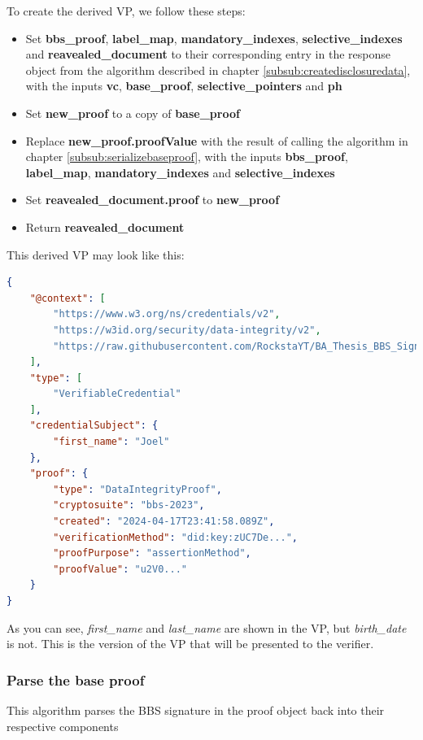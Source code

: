 \documentclass[
	a4paper               %
	,BCOR=0mm            %
	,bibliography=totoc   %
	,listof=totoc         %
	,monolingual
	,twoside=false
]{bfhthesis}              %
\begin{document}
To create the derived VP, we follow these steps:
\begin{itemize}
	\item Set \textbf{bbs\_proof}, \textbf{label\_map}, \textbf{mandatory\_indexes}, \textbf{selective\_indexes} and \textbf{reavealed\_document} to their corresponding entry in the response object from the algorithm described in chapter \ref{subsub:createdisclosuredata}, with the inputs \textbf{vc}, \textbf{base\_proof}, \textbf{selective\_pointers} and \textbf{ph}
	\item Set \textbf{new\_proof} to a copy of \textbf{base\_proof}
	\item Replace \textbf{new\_proof.proofValue} with the result of calling the algorithm in chapter \ref{subsub:serializebaseproof}, with the inputs \textbf{bbs\_proof}, \textbf{label\_map}, \textbf{mandatory\_indexes} and \textbf{selective\_indexes}
	\item Set \textbf{reavealed\_document.proof} to \textbf{new\_proof}
	\item Return \textbf{reavealed\_document}
\end{itemize}

This derived VP may look like this:
\begin{lstlisting}[language=json,firstnumber=1,caption={Derived VP},captionpos=b]
{
	"@context": [
		"https://www.w3.org/ns/credentials/v2",
		"https://w3id.org/security/data-integrity/v2",
		"https://raw.githubusercontent.com/RockstaYT/BA_Thesis_BBS_Signatures/docs/context/example_1.jsonld"
	],
	"type": [
		"VerifiableCredential"
	],
	"credentialSubject": {
		"first_name": "Joel"
	},
	"proof": {
		"type": "DataIntegrityProof",
		"cryptosuite": "bbs-2023",
		"created": "2024-04-17T23:41:58.089Z",
		"verificationMethod": "did:key:zUC7De...",
		"proofPurpose": "assertionMethod",
		"proofValue": "u2V0..."
	}
}
\end{lstlisting}

As you can see, \textit{first\_name} and \textit{last\_name} are shown in the VP, but \textit{birth\_date} is not.
This is the version of the VP that will be presented to the verifier.

\subsubsection{Parse the base proof}
\label{subsub:parsebaseproof}
This algorithm parses the BBS signature in the proof object back into their respective components\\
\end{document}

